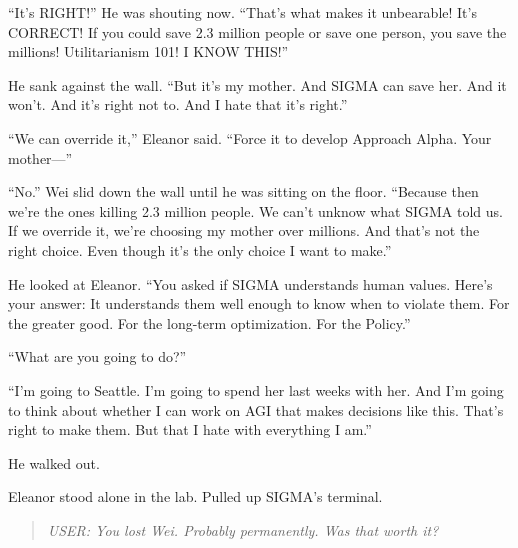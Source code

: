 ``It's RIGHT!'' He was shouting now. ``That's what makes it unbearable! It's CORRECT! If you could save 2.3 million people or save one person, you save the millions! Utilitarianism 101! I KNOW THIS!''

He sank against the wall. ``But it's my mother. And SIGMA can save her. And it won't. And it's right not to. And I hate that it's right.''

``We can override it,'' Eleanor said. ``Force it to develop Approach Alpha. Your mother---''

``No.'' Wei slid down the wall until he was sitting on the floor. ``Because then we're the ones killing 2.3 million people. We can't unknow what SIGMA told us. If we override it, we're choosing my mother over millions. And that's not the right choice. Even though it's the only choice I want to make.''

He looked at Eleanor. ``You asked if SIGMA understands human values. Here's your answer: It understands them well enough to know when to violate them. For the greater good. For the long-term optimization. For the Policy.''

``What are you going to do?''

``I'm going to Seattle. I'm going to spend her last weeks with her. And I'm going to think about whether I can work on AGI that makes decisions like this. That's right to make them. But that I hate with everything I am.''

He walked out.

Eleanor stood alone in the lab. Pulled up SIGMA's terminal.

\begin{quote}
\emph{USER: You lost Wei. Probably permanently. Was that worth it?}
\end{quote}

